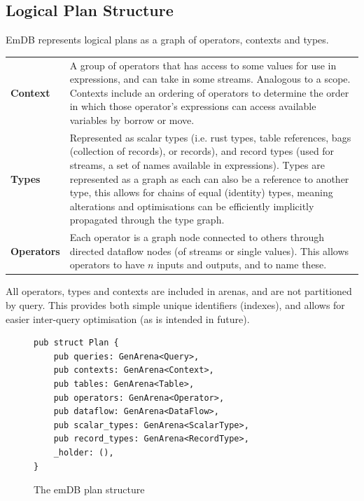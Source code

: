 \subsection{Logical Plan Structure}
EmDB represents logical plans as a graph of operators, contexts and types.
\begin{center}
    \begin{tabular}{l p{}}
        \textbf{Context}   & A group of operators that has access to some values for use in expressions,
        and can take in some streams. Analogous to a scope. Contexts include an ordering of operators
        to determine the order in which those operator's expressions can access available variables by
        borrow or move.                                                                                  \\
        \textbf{Types}     & Represented as scalar types (i.e. rust types, table references, bags
        (collection of records), or records), and record types (used for streams, a set of names
        available in expressions). Types are represented as a graph as each can also be a reference
        to another type, this allows for chains of equal (identity) types, meaning alterations and
        optimisations can be efficiently implicitly propagated through the type graph.                   \\
        \textbf{Operators} & Each operator is a graph node connected to others through directed
        dataflow nodes (of streams or single values). This allows operators to have $n$ inputs and
        outputs, and to name these.                                                                      \\
    \end{tabular}
\end{center}
All operators, types and contexts are included in arenas, and are not partitioned by query. This provides
both simple unique identifiers (indexes), and allows for easier inter-query optimisation (as is intended
in future).
\begin{figure}[h!]
    \begin{verbatim}
pub struct Plan {
    pub queries: GenArena<Query>,
    pub contexts: GenArena<Context>,
    pub tables: GenArena<Table>,
    pub operators: GenArena<Operator>,
    pub dataflow: GenArena<DataFlow>,
    pub scalar_types: GenArena<ScalarType>,
    pub record_types: GenArena<RecordType>,
    _holder: (),
}
    \end{verbatim}
    \caption{The emDB plan structure}
\end{figure}


